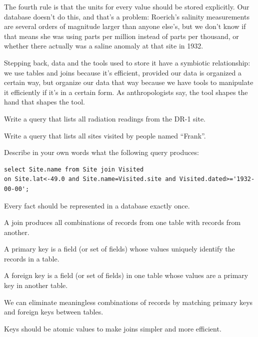 \documentclass{book}
\begin{document}
The fourth rule is that the units for every value should be stored
explicitly. Our database doesn't do this, and that's a problem:
Roerich's salinity measurements are several orders of magnitude larger
than anyone else's, but we don't know if that means she was using parts
per million instead of parts per thousand, or whether there actually was
a saline anomaly at that site in 1932.

Stepping back, data and the tools used to store it have a symbiotic
relationship: we use tables and joins because it's efficient, provided
our data is organized a certain way, but organize our data that way
because we have tools to manipulate it efficiently if it's in a certain
form. As anthropologists say, the tool shapes the hand that shapes the
tool.

\begin{challenge}
  Write a query that lists all radiation readings from the DR-1 site.
\end{challenge}

\begin{challenge}
  Write a query that lists all sites visited by people named ``Frank''.
\end{challenge}

\begin{challenge}
  Describe in your own words what the following query produces:

\begin{verbatim}
select Site.name from Site join Visited
on Site.lat<-49.0 and Site.name=Visited.site and Visited.dated>='1932-00-00';
\end{verbatim}
\end{challenge}

\begin{keypoints}
\begin{swcitemize}
\item
  Every fact should be represented in a database exactly once.
\item
  A join produces all combinations of records from one table with
  records from another.
\item
  A primary key is a field (or set of fields) whose values uniquely
  identify the records in a table.
\item
  A foreign key is a field (or set of fields) in one table whose values
  are a primary key in another table.
\item
  We can eliminate meaningless combinations of records by matching
  primary keys and foreign keys between tables.
\item
  Keys should be atomic values to make joins simpler and more efficient.
\end{swcitemize}
\end{keypoints}
\end{document}
